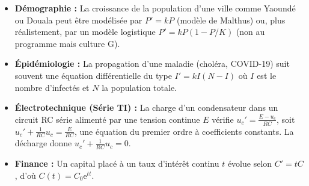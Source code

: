 \documentclass[11pt]{article}
\begin{document}
\begin{savaistu}
\begin{itemize}
\item \textbf{Démographie :} La croissance de la population d'une ville comme Yaoundé ou Douala peut être modélisée par $P' = kP$ (modèle de Malthus) ou, plus réalistement, par un modèle logistique $P' = kP(1 - P/K)$ (non au programme mais culture G).
\item \textbf{Épidémiologie :} La propagation d'une maladie (choléra, COVID-19) suit souvent une équation différentielle du type $I' = kI(N-I)$ où $I$ est le nombre d'infectés et $N$ la population totale.
\item \textbf{Électrotechnique (Série TI) :} La charge d'un condensateur dans un circuit RC série alimenté par une tension continue $E$ vérifie $u_c' = \frac{E - u_c}{RC}$, soit $u_c' + \frac{1}{RC}u_c = \frac{E}{RC}$, une équation du premier ordre à coefficients constants. La décharge donne $u_c' + \frac{1}{RC}u_c = 0$.
\item \textbf{Finance :} Un capital placé à un taux d'intérêt continu $t$ évolue selon $C' = tC$, d'où $C(t) = C_0\mathrm{e}^{tt}$.
\end{itemize}
\end{savaistu}
\end{document}
